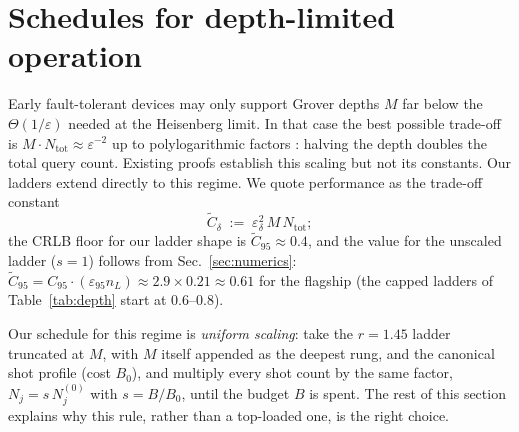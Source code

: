 \documentclass[%
 twocolumn,
 amsmath,amssymb,
prx,
longbibliography
]{revtex4-2}
\newcommand{\Ntot}{N_{\mathrm{tot}}}
\begin{document}
\section{Schedules for depth-limited operation}\label{sec:depth}

Early fault-tolerant devices may only support Grover depths $M$ far below the $\Theta(1/\varepsilon)$ needed at the Heisenberg limit. In that case the best possible trade-off is $M \cdot \Ntot \approx \varepsilon^{-2}$ up to polylogarithmic factors \cite{giurgica2022low, huang2026eigengap, erle2026anydepth}: halving the depth doubles the total query count. Existing proofs establish this scaling but not its constants. Our ladders extend directly to this regime. We quote performance as the trade-off constant
\begin{equation}
    \widetilde C_\delta \;:=\; \varepsilon_\delta^2\, M\, \Ntot;
\end{equation}
the \ac{CRLB} floor for our ladder shape is $\widetilde C_{95} \approx 0.4$, and the value for the unscaled ladder ($s = 1$) follows from Sec.~\ref{sec:numerics}: $\widetilde C_{95} = C_{95}\cdot(\varepsilon_{95} n_L) \approx 2.9 \times 0.21 \approx 0.61$ for the flagship (the capped ladders of Table~\ref{tab:depth} start at $0.6$--$0.8$).

Our schedule for this regime is \emph{uniform scaling}: take the $r = 1.45$ ladder truncated at $M$, with $M$ itself appended as the deepest rung, and the canonical shot profile (cost $B_0$), and multiply every shot count by the same factor, $N_j = s\, N_j^{(0)}$ with $s = B/B_0$, until the budget $B$ is spent. The rest of this section explains why this rule, rather than a top-loaded one, is the right choice.
\end{document}
